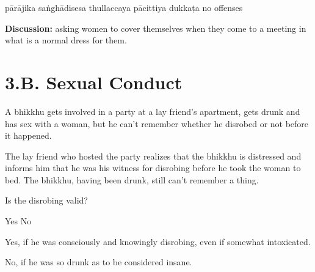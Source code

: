\begin{exam}{\autoExamName}
\begin{problem*}
\begin{parts}
  \begin{answers}{6}
    \bChoices
     pārājika\eAns
     saṅghādisesa\eAns
     thullaccaya\eAns
     pācittiya\eAns
     dukkaṭa\eAns
     no offenses\eAns
    \eChoices
  \end{answers}

  \bigskip

  \textbf{Discussion:} asking women to cover themselves when they come to a
  meeting in what is a normal dress for them.

  \bigskip

\end{parts}

\end{problem*}

\end{exam}

\chapter{3.B. Sexual Conduct}
\renewcommand*{\theChapterTitle}{3.B. Sexual Conduct}

\begin{exam}{\autoExamName}

\begin{problem}
  A bhikkhu gets involved in a party at a lay friend's apartment, gets drunk and has sex with a woman,
  but he can't remember whether he disrobed or not before it happened.

  \bigskip

  The lay friend who hosted the party realizes that the bhikkhu is distressed
  and informs him that he was his witness for disrobing
  before he took the woman to bed.
  The bhikkhu, having been drunk, still can't remember a thing.

  \bigskip

  Is the disrobing valid?

  \bigskip

  \begin{answers}{2}
    \bChoices
     Yes\eAns
     No\eAns
    \eChoices
  \end{answers}

  \begin{solution}
    Yes, if he was consciously and knowingly disrobing, even if somewhat intoxicated.

    No, if he was so drunk as to be considered insane.
  \end{solution}

\end{problem}

\end{exam}
